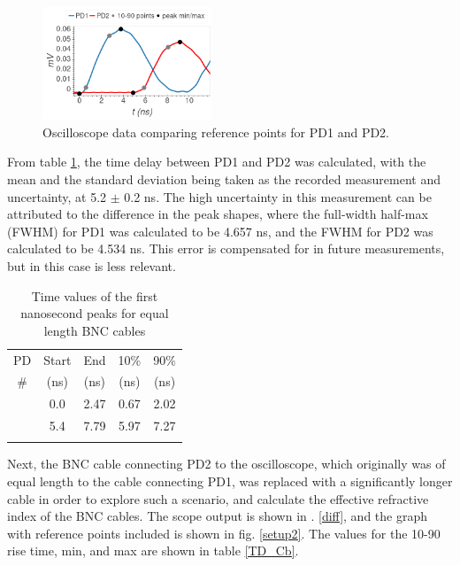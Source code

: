 \documentclass[aps,prl,reprint]{revtex4-2}
\begin{document}
\begin{figure}[h]
\includegraphics[width=0.45\textwidth]{../Images/l4_C_b.png}
\caption{\label{same} Oscilloscope data comparing reference points for PD1 and PD2.}
\end{figure}

From table \ref{TD_Ca}, the time delay between PD1 and PD2 was calculated, with the
mean and the standard deviation being taken as the recorded measurement and 
uncertainty, at 5.2 $\pm$ 0.2 ns. The high uncertainty in this measurement can
be attributed to the difference in the peak shapes, where the full-width half-max (FWHM)
for PD1 was calculated to be 4.657 ns, and the FWHM for PD2 was calculated to be 4.534 ns.
This error is compensated for in future measurements, but in this case is less relevant. \\

\begin{table}[h]
\renewcommand{\arraystretch}{1.35}
\setlength{\tabcolsep}{10pt}
\caption{\label{TD_Ca}Time values of the first nanosecond peaks for equal length BNC cables}
\begin{tabular}{|c|c|c|c|c|}
\toprule
PD & Start & End & 10\% & 90\% \\
\# & (ns)& (ns)& (ns)& (ns)\\
\colrule
1 &    0.0 &  2.47 &  0.67 &  2.02 \\
\colrule
2 &    5.4 &  7.79 &  5.97 &  7.27 \\
\hline
\botrule
\end{tabular}
\end{table}

Next, the BNC cable connecting PD2 to the oscilloscope, which originally was of equal 
length to the cable connecting PD1, was replaced with a significantly longer cable in order
to explore such a scenario, and calculate the effective refractive index of the BNC
cables. The scope output is shown in \fig. \ref{diff}, and the graph with reference points 
included is shown in fig. \ref{setup2}. The values for the 10-90 rise time, min, and max are
shown in table \ref{TD_Cb}. \\
\end{document}
